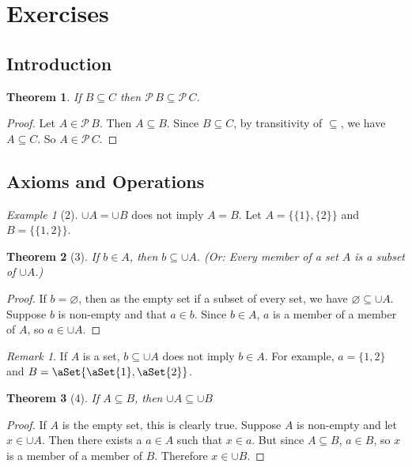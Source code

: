 \documentclass[12pt]{article}
\theoremstyle{plain}
\newtheorem*{exthm}{Theorem}
\theoremstyle{remark}
\newtheorem*{eg}{Example}
\theoremstyle{definition}
\theoremstyle{remark}
\newtheorem*{remark}{Remark}
\newcommand{\powerset}{\mathscr{P}\,}
\DeclarePairedDelimiter\aSet\{\}
\begin{document}
\section{Exercises}
\subsection{Introduction}

\begin{exthm}
If $B \subseteq C$ then $\powerset B \subseteq \powerset C$.
\end{exthm}
\begin{proof}
Let $A \in \powerset B$. Then $A \subseteq B$. Since $B \subseteq C$, by transitivity of $\subseteq$, we have $A \subseteq C$. So $A \in \powerset C$.
\end{proof}


\subsection{Axioms and Operations}

\begin{eg}[2]
$\cup A = \cup B$ does not imply $A = B$.
Let $A = \{\{1\}, \{2\}\}$ and $B = \{\{1, 2\}\}$.
\end{eg}

\begin{exthm}[3]\label{memberUnion}
If $b \in A$, then $b \subseteq \cup A$. (Or: Every member of a set $A$ is a subset of $\cup A$.)
\end{exthm}
\begin{proof}
If $b = \varnothing$, then as the empty set if a subset of every set, we have $\varnothing \subseteq \cup A$.  Suppose $b$ is non-empty and that $a \in b$. Since $b \in A$, $a$ is a member of a member of $A$, so $a \in \cup A$.
\end{proof}
\begin{remark}
If $A$ is a set, $b \subseteq \cup A$ does not imply $b \in A$. For example, $a = \{1,2\}$ and $B = \aSet{\aSet{1}, \aSet{2}}$.
\end{remark}

\begin{exthm}[4]
If $A \subseteq B$, then $\cup A \subseteq \cup B$
\end{exthm}
\begin{proof}
If $A$ is the empty set, this is clearly true. Suppose $A$ is non-empty and let $x \in \cup A$. Then there exists a $a \in A$ such that $x \in a$. But since $A \subseteq B$, $a \in B$, so $x$ is a member of a member of $B$. Therefore $x \in \cup B$.
\end{proof}
\end{document}
